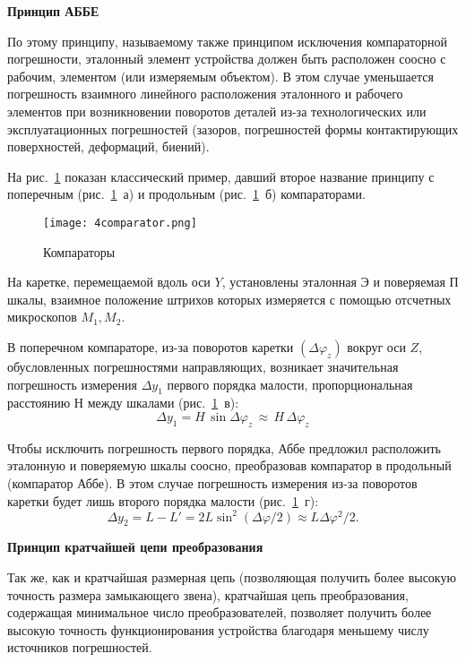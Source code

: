 \begin{flushleft}
\textbf{Принцип АББЕ}
\end{flushleft}

По этому принципу, называемому также принципом исключения компараторной погрешности, эталонный элемент устройства должен быть расположен соосно с рабочим, элементом (или измеряемым объектом). В этом случае уменьшается погрешность взаимного линейного расположения эталонного и рабочего элементов при возникновении поворотов деталей из-за технологических или эксплуатационных погрешностей (зазоров, погрешностей формы контактирующих поверхностей, деформаций, биений).

На рис.~\ref{pic:4comparator} показан классический пример, давший второе название принципу с поперечным (рис.~\ref{pic:4comparator}~а) и продольным (рис.~\ref{pic:4comparator}~б) компараторами.
\begin{figure}[h!]
	\caption{Компараторы}
	\texttt{[image: 4comparator.png]}
	\label{pic:4comparator}
\end{figure}

На каретке, перемещаемой вдоль оси $ Y $, установлены эталонная Э и поверяемая П шкалы, взаимное положение штрихов которых измеряется с помощью отсчетных микроскопов $ M_1, M_2 $.

В поперечном компараторе, из-за поворотов каретки $ (\Delta \varphi_z) $ вокруг оси $ Z $, обусловленных погрешностями направляющих, возникает значительная погрешность измерения $ \Delta y_1 $ первого порядка малости, пропорциональная расстоянию $ Н $ между шкалами (рис.~\ref{pic:4comparator}~в):
\[ 
\Delta y_1 = H\,\sin\Delta\varphi_z\,\approx\, H\,\Delta\varphi_z
\]

Чтобы исключить погрешность первого порядка, Аббе предложил расположить эталонную и поверяемую шкалы соосно, преобразовав компаратор в продольный (компаратор Аббе). В этом случае погрешность измерения из-за поворотов каретки будет лишь второго порядка малости (рис.~\ref{pic:4comparator}~г):
\[ 
\Delta y_2 = L - L' = 2L\sin^2(\Delta\varphi/2) \approx L \Delta\varphi^2 /2.
\]

\begin{flushleft}
\textbf{Принцип кратчайшей цепи преобразования}
\end{flushleft}

Так же, как и кратчайшая размерная цепь (позволяющая получить более высокую точность размера замыкающего звена), кратчайшая цепь преобразования, содержащая минимальное число преобразователей, позволяет получить более высокую точность функционирования устройства благодаря меньшему числу источников погрешностей.


